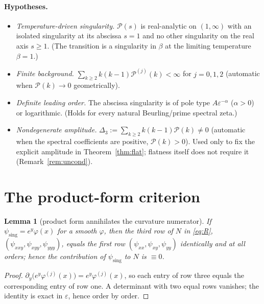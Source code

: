 \documentclass[a4paper,11pt]{article}
\theoremstyle{plain}
\newtheorem{lemma}{Lemma}
\theoremstyle{definition}
\theoremstyle{remark}
\newcommand{\eps}{\varepsilon}
\begin{document}
\paragraph{Hypotheses.}
\begin{itemize}
\item[\textbf{(H1)}] \emph{Temperature-driven singularity.} $\mathcal P(s)$ is real-analytic on
$(1,\infty)$ with an isolated singularity at its abscissa $s=1$ and no other singularity on the real
axis $s\ge1$. (The transition is a singularity in $\beta$ at the limiting temperature $\beta=1$.)
\item[\textbf{(H2)}] \emph{Finite background.} $\sum_{k\ge2}k(k-1)\mathcal P^{(j)}(k)<\infty$ for
$j=0,1,2$ (automatic when $\mathcal P(k)\to0$ geometrically).
\item[\textbf{(C1)}] \emph{Definite leading order.} The abscissa singularity is of pole type
$A\eps^{-\alpha}$ ($\alpha>0$) or logarithmic. (Holds for every natural Beurling/prime spectral zeta.)
\item[\textbf{(C2)}] \emph{Nondegenerate amplitude.} $\Delta_3:=\sum_{k\ge2}k(k-1)\mathcal P(k)\neq0$
(automatic when the spectral coefficients are positive, $\mathcal P(k)>0$). Used only to fix the explicit
amplitude in Theorem~\ref{thm:flat}; flatness itself does not require it (Remark~\ref{rem:uncond}).
\end{itemize}

\section{The product-form criterion}\label{sec:lemmas}

\begin{lemma}[product form annihilates the curvature numerator]\label{lem:C1}
If $\psi_{\mathrm{sing}}=e^{y}\varphi(x)$ for a smooth $\varphi$, then the third row of $N$ in
\eqref{eq:R}, $(\psi_{xxy},\psi_{xyy},\psi_{yyy})$, equals the first row
$(\psi_{xx},\psi_{xy},\psi_{yy})$ identically and at all orders; hence the contribution of
$\psi_{\mathrm{sing}}$ to $N$ is $\equiv0$.
\end{lemma}
\begin{proof}
$\partial_y\!\big(e^{y}\varphi^{(j)}(x)\big)=e^{y}\varphi^{(j)}(x)$, so each entry of row three equals
the corresponding entry of row one. A determinant with two equal rows vanishes; the identity is exact
in $\eps$, hence order by order.
\end{proof}
\end{document}
